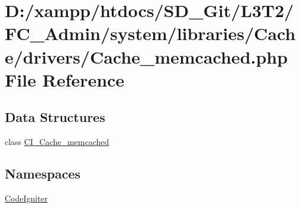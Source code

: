 \hypertarget{_admin_2system_2libraries_2_cache_2drivers_2_cache__memcached_8php}{}\section{D\+:/xampp/htdocs/\+S\+D\+\_\+\+Git/\+L3\+T2/\+F\+C\+\_\+\+Admin/system/libraries/\+Cache/drivers/\+Cache\+\_\+memcached.php File Reference}
\label{_admin_2system_2libraries_2_cache_2drivers_2_cache__memcached_8php}
\subsection*{Data Structures}
\begin{DoxyCompactItemize}
\item 
class \hyperlink{class_c_i___cache__memcached}{C\+I\+\_\+\+Cache\+\_\+memcached}
\end{DoxyCompactItemize}
\subsection*{Namespaces}
\begin{DoxyCompactItemize}
\item 
 \hyperlink{namespace_code_igniter}{Code\+Igniter}
\end{DoxyCompactItemize}
